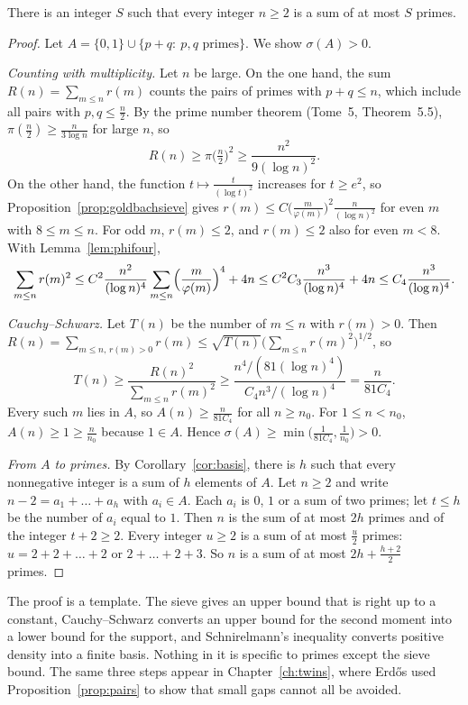 \begin{theorem}[Schnirelmann, 1930]\label{thm:schnirelmann}
There is an integer $S$ such that every integer $n\ge2$ is a sum of at most $S$ primes.
\end{theorem}
\begin{proof}
Let $A=\{0,1\}\cup\{p+q:\ p,q\text{ primes}\}$. We show $\sigma(A)>0$.

\emph{Counting with multiplicity.} Let $n$ be large. On the one hand, the sum $R(n)=\sum_{m\le n}r(m)$ counts the pairs of primes with $p+q\le n$, which
include all pairs with $p,q\le\frac n2$. By the prime number theorem (Tome~5, Theorem~5.5), $\pi(\frac n2)\ge\frac n{3\log n}$ for large $n$, so
\[
R(n)\ge\pi\bigl(\tfrac n2\bigr)^2\ge\frac{n^2}{9(\log n)^2}.
\]
On the other hand, the function $t\mapsto\frac t{(\log t)^2}$ increases for $t\ge e^2$, so Proposition~\ref{prop:goldbachsieve} gives
$r(m)\le C\bigl(\frac m{\varphi(m)}\bigr)^2\frac n{(\log n)^2}$ for even $m$ with $8\le m\le n$. For odd $m$, $r(m)\le2$, and $r(m)\le2$ also for even $m<8$.
With Lemma~\ref{lem:phifour},
\[
\sum_{m\le n}r(m)^2\le C^2\frac{n^2}{(\log n)^4}\sum_{m\le n}\Bigl(\frac m{\varphi(m)}\Bigr)^4+4n\le C^2C_3\frac{n^3}{(\log n)^4}+4n\le C_4\frac{n^3}{(\log n)^4}.
\]

\emph{Cauchy--Schwarz.} Let $T(n)$ be the number of $m\le n$ with $r(m)>0$. Then $R(n)=\sum_{m\le n,\,r(m)>0}r(m)\le\sqrt{T(n)}\bigl(\sum_{m\le n}r(m)^2\bigr)^{1/2}$,
so
\[
T(n)\ge\frac{R(n)^2}{\sum_{m\le n}r(m)^2}\ge\frac{n^4/(81(\log n)^4)}{C_4n^3/(\log n)^4}=\frac n{81C_4}.
\]
Every such $m$ lies in $A$, so $A(n)\ge\frac n{81C_4}$ for all $n\ge n_0$. For $1\le n<n_0$, $A(n)\ge1\ge\frac n{n_0}$ because $1\in A$. Hence
$\sigma(A)\ge\min\bigl(\frac1{81C_4},\frac1{n_0}\bigr)>0$.

\emph{From $A$ to primes.} By Corollary~\ref{cor:basis}, there is $h$ such that every nonnegative integer is a sum of $h$ elements of $A$. Let $n\ge2$ and write
$n-2=a_1+\dots+a_h$ with $a_i\in A$. Each $a_i$ is $0$, $1$ or a sum of two primes; let $t\le h$ be the number of $a_i$ equal to $1$. Then $n$ is the sum
of at most $2h$ primes and of the integer $t+2\ge2$. Every integer $u\ge2$ is a sum of at most $\frac u2$ primes: $u=2+2+\dots+2$ or $2+\dots+2+3$.
So $n$ is a sum of at most $2h+\frac{h+2}2$ primes.
\end{proof}

The proof is a template. The sieve gives an upper bound that is right up to a constant, Cauchy--Schwarz converts an upper bound for the second moment
into a lower bound for the support, and Schnirelmann's inequality converts positive density into a finite basis. Nothing in it is specific to primes
except the sieve bound. The same three steps appear in Chapter~\ref{ch:twins}, where Erd\H{o}s used Proposition~\ref{prop:pairs} to show that small
gaps cannot all be avoided.

